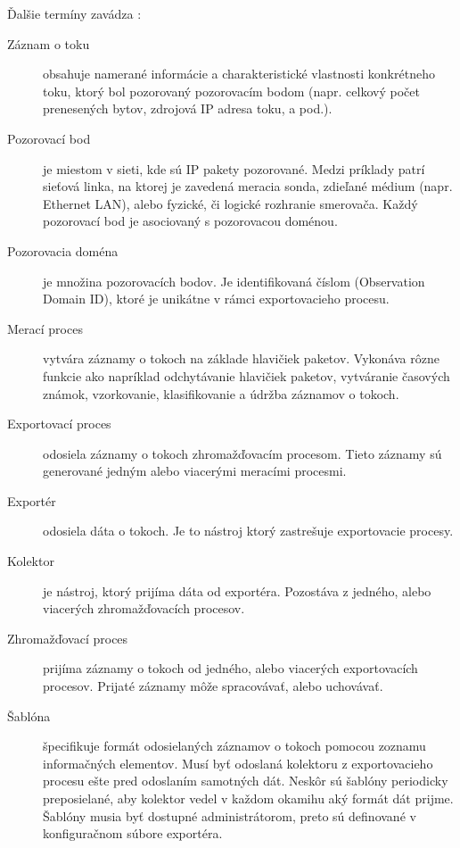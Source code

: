 Ďalšie termíny zavádza \citep{rfc5101}:
\begin{description}
  \item[Záznam o toku] obsahuje namerané informácie a charakteristické vlastnosti 
konkrétneho toku, ktorý bol pozorovaný pozorovacím bodom (napr. celkový počet prenesených 
bytov, zdrojová IP adresa toku, a pod.).

  \item[Pozorovací bod] je miestom v sieti, kde sú IP pakety pozorované. Medzi príklady patrí 
sieťová linka, na ktorej je zavedená meracia sonda, zdieľané médium (napr. Ethernet LAN), 
alebo fyzické, či logické rozhranie smerovača. Každý pozorovací bod je asociovaný s 
pozorovacou doménou. 

  \item[Pozorovacia doména] je množina pozorovacích bodov. Je identifikovaná číslom 
(Observation Domain ID), ktoré je unikátne v rámci exportovacieho procesu. 

  \item[Merací proces] vytvára záznamy o tokoch na základe hlavičiek paketov. Vykonáva 
rôzne funkcie ako napríklad odchytávanie hlavičiek paketov, vytváranie časových známok, 
vzorkovanie, klasifikovanie a údržba záznamov o tokoch. 

  \item[Exportovací proces] odosiela záznamy o tokoch zhromažďovacím 
procesom. Tieto záznamy sú generované jedným alebo viacerými meracími procesmi.
	
  \item[Exportér] odosiela dáta o tokoch. Je to nástroj ktorý zastrešuje exportovacie procesy.

  \item[Kolektor] je nástroj, ktorý prijíma dáta od exportéra. Pozostáva z jedného, alebo
viacerých zhromažďovacích procesov.

  \item[Zhromažďovací proces] prijíma záznamy o tokoch od jedného, alebo viacerých 
exportovacích procesov. Prijaté záznamy môže spracovávať, alebo uchovávať. 

  \item[Šablóna] špecifikuje formát odosielaných záznamov o tokoch pomocou zoznamu 
informačných elementov. Musí byť odoslaná kolektoru 
z exportovacieho procesu ešte pred odoslaním samotných dát. Neskôr sú šablóny periodicky 
preposielané, aby kolektor vedel v každom okamihu aký formát dát prijme. 
Šablóny musia byť dostupné administrátorom, preto sú definované v konfiguračnom súbore 
exportéra.
\citep{juvhaugen}


\end{description}
